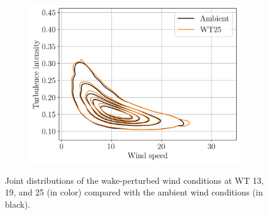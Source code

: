 \begin{figure}
\begin{subfigure}[b]{0.48\textwidth}
        \includegraphics[width=\textwidth]{part2/figures/WAKE/joint_perturbation_SB_WT25.png}
    \end{subfigure}
    \caption{Joint distributions of the wake-perturbed wind conditions at WT 13, 19, and 25 (in color) compared with the ambient wind conditions (in black).}
    \label{fig:FIGJointPerturbationSB}
\end{figure}

